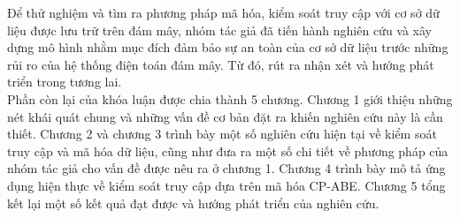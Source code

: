 \indent Để thử nghiệm và tìm ra phương pháp mã hóa, kiểm soát truy cập với cơ sở dữ liệu được lưu trữ trên đám mây, nhóm tác giả đã tiến hành nghiên cứu và xây dựng mô hình nhằm mục đích đảm bảo sự an toàn của cơ sở dữ liệu trước những rủi ro của hệ thống điện toán đám mây. Từ đó, rút ra nhận xét và hướng phát triển trong tương lai. \\
\indent
Phần còn lại của khóa luận được chia thành 5 chương. Chương 1 giới thiệu những nét khái quát chung và những vấn đề cơ bản đặt ra khiến nghiên cứu này là cần thiết. Chương 2 và chương 3 trình bày một số nghiên cứu hiện tại về kiểm soát truy cập và mã hóa dữ liệu, cũng như đưa ra một số chi tiết về phương pháp của nhóm tác giả cho vấn đề được nêu ra ở chương 1. Chương 4 trình bày mô tả ứng dụng hiện thực về kiểm soát truy cập dựa trên mã hóa CP-ABE. Chương 5 tổng kết lại một số kết quả đạt được và hướng phát triển của nghiên cứu.


